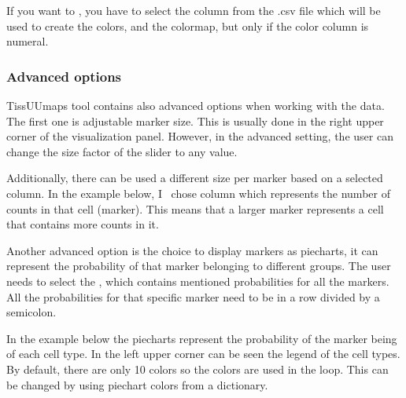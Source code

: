 \documentclass[letterpaper,10pt,english,openany,oneside]{sphinxmanual}
\begin{document}
\sphinxAtStartPar
{}

\sphinxAtStartPar
If you want to , you have to select the column from the .csv file which will be used to create the colors, and the colormap, but only if the color column is numeral.

\sphinxAtStartPar
{}


\subsubsection{Advanced options}
\label{\detokenize{docs/starting/markers:advanced-options}}
\sphinxAtStartPar
TissUUmaps tool contains also advanced options when working with the data. The first one is adjustable marker size. This is usually done in the right upper corner of the visualization panel. However, in the advanced setting, the user can change the size factor of the slider to any value.

\sphinxAtStartPar
{}

\sphinxAtStartPar
Additionally, there can be used a different size per marker based on a selected column. In the example below, I  chose column  which represents the number of counts in that cell (marker). This means that a larger marker represents a cell that contains more counts in it.

\sphinxAtStartPar
{}

\sphinxAtStartPar
Another advanced option is the choice to display markers as pie\sphinxhyphen{}charts, it can represent the probability of that marker belonging to different groups. The user needs to select the , which contains mentioned probabilities for all the markers. All the probabilities for that specific marker need to be in a row divided by a semicolon.

\sphinxAtStartPar
{}

\sphinxAtStartPar
In the example below the pie\sphinxhyphen{}charts represent the probability of the marker being of each cell type. In the left upper corner can be seen the legend of the cell types. By default, there are only 10 colors so the colors are used in the loop. This can be changed by using pie\sphinxhyphen{}chart colors from a dictionary.

\sphinxAtStartPar
{}
\end{document}
